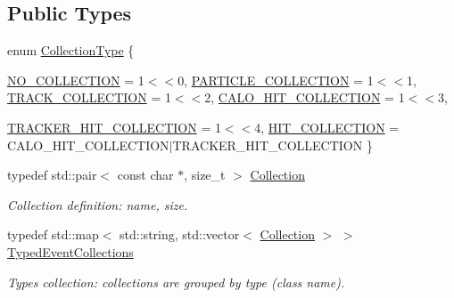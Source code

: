 \subsection*{Public Types}
\begin{DoxyCompactItemize}
\item 
enum \hyperlink{class_d_d4hep_1_1_event_handler_a0b22a141a019364495835317fad48254}{CollectionType} \{ \par
\hyperlink{class_d_d4hep_1_1_event_handler_a0b22a141a019364495835317fad48254a97cb7e022ec3a608b95e9c0f0395f875}{NO\_\-COLLECTION} = 1$<$$<$0, 
\hyperlink{class_d_d4hep_1_1_event_handler_a0b22a141a019364495835317fad48254a694c9a04628f4dd1ac5bae0697b6403b}{PARTICLE\_\-COLLECTION} = 1$<$$<$1, 
\hyperlink{class_d_d4hep_1_1_event_handler_a0b22a141a019364495835317fad48254a320d668d3b9972c63a98e2cbf788a6a4}{TRACK\_\-COLLECTION} = 1$<$$<$2, 
\hyperlink{class_d_d4hep_1_1_event_handler_a0b22a141a019364495835317fad48254af204316bf52273227210419965b95b43}{CALO\_\-HIT\_\-COLLECTION} = 1$<$$<$3, 
\par
\hyperlink{class_d_d4hep_1_1_event_handler_a0b22a141a019364495835317fad48254a157b5d4bcda403c48a5cb368d8671761}{TRACKER\_\-HIT\_\-COLLECTION} = 1$<$$<$4, 
\hyperlink{class_d_d4hep_1_1_event_handler_a0b22a141a019364495835317fad48254acaedbfda8dbee1f6ab8d296b875dcb07}{HIT\_\-COLLECTION} = CALO\_\-HIT\_\-COLLECTION$|$TRACKER\_\-HIT\_\-COLLECTION
 \}
\item 
typedef std::pair$<$ const char $\ast$, size\_\-t $>$ \hyperlink{class_d_d4hep_1_1_event_handler_abc271087910b2013962fa4a83d4f349e}{Collection}
\begin{DoxyCompactList}\small\item\em Collection definition: name, size. \item\end{DoxyCompactList}\item 
typedef std::map$<$ std::string, std::vector$<$ \hyperlink{class_d_d4hep_1_1_event_handler_abc271087910b2013962fa4a83d4f349e}{Collection} $>$ $>$ \hyperlink{class_d_d4hep_1_1_event_handler_a4d441ff8a824b1e2f278e8b7a6391af3}{TypedEventCollections}
\begin{DoxyCompactList}\small\item\em Types collection: collections are grouped by type (class name). \item\end{DoxyCompactList}\end{DoxyCompactItemize}
